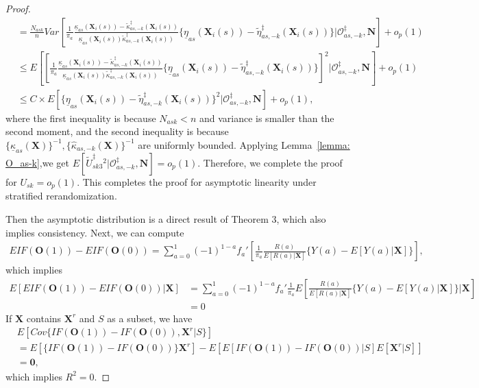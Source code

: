 \documentclass[12pt]{article}
\newcommand{\bX}{\boldsymbol{X}}
\newcommand{\bO}{\boldsymbol{O}}
\newcommand{\bN}{\boldsymbol{N}}
\newcommand{\bzero}{\boldsymbol{0}}
\begin{document}
\begin{proof}
\begin{align*}
    &= \frac{N_{ask}}{n}Var\left[\frac{1}{\pi_a} \frac{\underline{\kappa}_{as}(\bX_i(s)) - \widetilde{\kappa}^\ddagger_{as,-k}(\bX_i(s))}{\underline{\kappa}_{as}(\bX_i(s))\widetilde{\kappa}^\ddagger_{as,-k}(\bX_i(s))}\{\underline{\eta}_{as}(\bX_i(s))-\widetilde{\eta}_{as,-k}^\ddagger(\bX_i(s))\}\bigg|\mathcal{O}_{as,-k}^\ddagger,\bN\right] + o_p(1) \\
    &\le E\left[\left[\frac{1}{\pi_a} \frac{\underline{\kappa}_{as}(\bX_i(s)) - \widetilde{\kappa}^\ddagger_{as,-k}(\bX_i(s))}{\underline{\kappa}_{as}(\bX_i(s))\widetilde{\kappa}^\ddagger_{as,-k}(\bX_i(s))}\{\underline{\eta}_{as}(\bX_i(s))-\widetilde{\eta}_{as,-k}^\ddagger(\bX_i(s))\}\right]^2\bigg|\mathcal{O}_{as,-k}^\ddagger,\bN\right] + o_p(1) \\
    &\le C\times E\left[\{\underline{\eta}_{as}(\bX_i(s))-\widetilde{\eta}_{as,-k}^\ddagger(\bX_i(s))\}^2\bigg|\mathcal{O}_{as,-k}^\ddagger,\bN\right] + o_p(1),
\end{align*}
where the first inequality is because $N_{ask} < n$ and variance is smaller than the second moment, and the second inequality is because $ \{\underline{\kappa}_{as}(\bX)\}^{-1}, \{\widehat{\kappa}_{as,-k}(\bX)\}^{-1}$ are uniformly bounded. Applying Lemma~\ref{lemma: O_as-k},we get $E[\widetilde{U}_{sk3}^\ddagger{}^2|\mathcal{O}_{as,-k}^\ddagger,\bN] =o_p(1)$. Therefore, we complete the proof for $U_{sk} = o_p(1)$. This completes the proof for asymptotic linearity under stratified rerandomization. 

Then the asymptotic distribution is a direct result of Theorem 3, which also implies consistency. Next, we can compute
\begin{align*}
    EIF(\bO(1)) - EIF(\bO(0)) = \sum_{a=0}^1 (-1)^{1-a} f_a'\left[ \frac{1}{\pi_a} \frac{R(a)}{E[R(a)|\bX]}\{Y(a) - E[Y(a)|\bX]\} \right],
\end{align*}
which implies
\begin{align*}
    E\left[EIF(\bO(1)) - EIF(\bO(0))|\bX\right] &= \sum_{a=0}^1 (-1)^{1-a} f_a' \frac{1}{\pi_a} E\left[\frac{R(a)}{E[R(a)|\bX]}\{Y(a) - E[Y(a)|\bX]\}\bigg|\bX\right] \\
    &= 0
\end{align*}
If $\bX$ contains $\bX^r$ and $S$ as a subset, we have
\begin{align*}
    & E[Cov\{IF(\bO(1)) - IF(\bO(0)), \bX^r|S\}]\\
    &= E[\{IF(\bO(1)) - IF(\bO(0))\}\bX^r] - E[E[IF(\bO(1)) - IF(\bO(0))|S]E[\bX^r|S]] \\
    &= \bzero,
\end{align*}
which implies $R^2=0$.



\end{proof}
\end{document}
